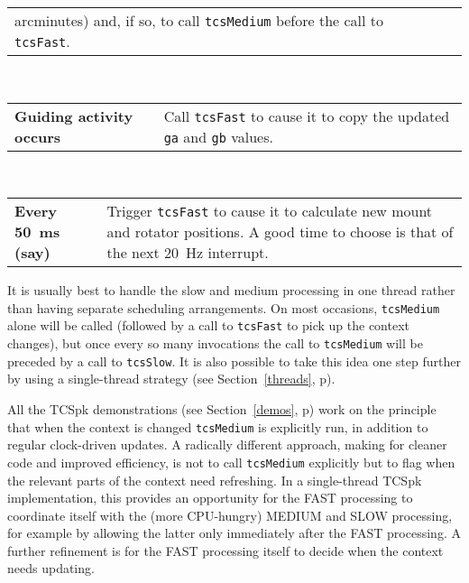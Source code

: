 \documentclass[12pt,fleqn,twoside]{article}
\renewcommand{\_}{{\tt\char'137}}     %
\begin{document}
\begin{center}
\begin{tabular}{p{27ex}p{48ex}}
                               arcminutes) and, if so, to call
                               {\tt tcsMedium} before the call to
                               {\tt tcsFast}. \\
\end{tabular}
\\[\medskipamount]
\begin{tabular}{p{27ex}p{48ex}}
  \raggedright {\bf Guiding
  activity occurs}           & \raggedright Call {\tt tcsFast} to
                               cause it to copy the
                               updated {\tt ga} and {\tt gb} values. \\
\end{tabular}
\\[\medskipamount]
\begin{tabular}{p{27ex}p{48ex}}
  \raggedright {\bf Every
  50~ms (say)}               & Trigger {\tt tcsFast} to cause it to
                               calculate new mount and rotator
                               positions.  A good time to choose is
                               that of the next 20~Hz interrupt. \\
\end{tabular}
\end{center}

It is usually best to handle the slow and medium processing
in one thread rather
than having separate scheduling arrangements.  On most occasions,
{\tt tcsMedium} alone will be called
(followed by a call to {\tt tcsFast} to pick up the
context changes), but once every
so many invocations the call to {\tt tcsMedium} will be preceded by a
call to {\tt tcsSlow}.  It is also possible to take this idea
one step further by using a
single-thread strategy (see Section~\ref{threads}, p\pageref{threads}).

All the TCSpk demonstrations (see Section~\ref{demos}, p\pageref{demos})
work on the principle that when the context is changed {\tt tcsMedium}
is explicitly run, in addition to regular clock-driven
updates.
A radically different approach, making for cleaner code and
improved efficiency, is
not to call {\tt tcsMedium} explicitly
but to flag when the relevant parts of the context
need refreshing.  In a single-thread TCSpk implementation, this provides
an opportunity for the FAST processing to coordinate itself with the
(more CPU-hungry) MEDIUM and SLOW processing, for example by allowing
the latter only immediately after the FAST processing.  A further
refinement is for the FAST processing itself to decide when the
context needs updating.
\end{document}
